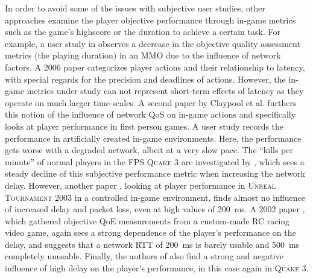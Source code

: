 In order to avoid some of the issues with subjective user studies, other approaches examine the player objective performance through in-game metrics such as the game's highscore or the duration to achieve a certain task. For example, a user study in \cite{Chen:2006:SOG:1167838.1167859} observes a decrease in the objective quality assessment metrics (the playing duration) in an \gls{MMO} due to the influence of network factors. A 2006 paper \cite{Claypool:2006:LPA:1167838.1167860} categorizes player actions and their relationship to latency, with special regards for the precision and deadlines of actions. However, the in-game metrics under study can not represent short-term effects of latency as they operate on much larger time-scales. 
A second paper by Claypool et al. \cite{claypool2007} furthers this notion of the influence of network \gls{QoS} on in-game actions and specifically looks at player performance in first person games. A user study records the performance in artificially created in-game environments. Here, the performance gets worse with a degraded network, albeit at a very slow pace. %
The ``kills per minute'' of normal players in the \gls{FPS} \textsc{Quake 3} are investigated by \cite{1266180}, which sees a steady decline of this subjective performance metric when increasing the network delay. However, another paper \cite{Beigbeder:2004:ELL:1016540.1016556}, looking at player performance in \textsc{Unreal Tournament 2003} in a controlled in-game environment, finds almost no influence of increased delay and packet loss, even at high values of \SI{200}{\milli\second}. %
A 2002 paper \cite{Pantel:2002:IDR:507670.507674}, which gathered objective \gls{QoE} measurements from a custom-made RC racing video game, again sees a strong dependence of the player's performance on the delay, and suggests that a network \acrshort{RTT} of \SI{200}{\milli\second} is barely usable and \SI{500}{\milli\second} completely unusable. Finally, the authors of \cite{Bredel:2010:MSR:1944796.1944797} also find a strong and negative influence of high delay on the player's performance, in this case again in \textsc{Quake 3}. 

